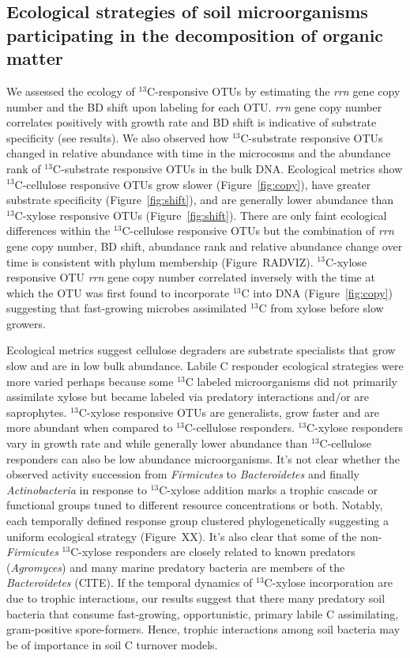 \subsection{Ecological strategies of soil microorganisms participating in the
decomposition of organic matter}
We assessed the ecology of $^{13}$C-responsive OTUs by estimating the
\textit{rrn} gene copy number and the BD shift upon labeling for each OTU.
\textit{rrn} gene copy number correlates positively with growth rate
\citep{11125085} and BD shift is indicative of substrate specificity (see
results). We also observed how $^{13}$C-substrate responsive OTUs changed in
relative abundance with time in the microcosms and the abundance rank of
$^{13}$C-substrate responsive OTUs in the bulk DNA. Ecological metrics show
$^{13}$C-cellulose responsive OTUs grow slower (Figure~\ref{fig:copy}), have
greater substrate specificity (Figure~\ref{fig:shift}), and are generally lower
abundance than $^{13}$C-xylose responsive OTUs (Figure~\ref{fig:shift}). There
are only faint ecological differences within the $^{13}$C-cellulose responsive
OTUs but the combination of \textit{rrn} gene copy number, BD shift, abundance
rank and relative abundance change over time is consistent with phylum
membership (Figure~RADVIZ). $^{13}$C-xylose responsive OTU \textit{rrn} gene
copy number correlated inversely with the time at which the OTU was first
found to incorporate $^{13}$C into DNA (Figure~\ref{fig:copy}) suggesting that
fast-growing microbes assimilated $^{13}$C from xylose before slow growers.  

Ecological metrics suggest cellulose degraders are substrate specialists that
grow slow and are in low bulk abundance. Labile C responder ecological
strategies were more varied perhaps because some $^{13}$C labeled
microorganisms did not primarily assimilate xylose but became labeled via
predatory interactions and/or are saprophytes. $^{13}$C-xylose responsive OTUs
are generalists, grow faster and are more abundant when compared to
$^{13}$C-cellulose responders. $^{13}$C-xylose responders vary in growth rate
and while generally lower abundance than $^{13}$C-cellulose responders can also
be low abundance microorganisms. It's not clear whether the observed activity
succession from \textit{Firmicutes} to \textit{Bacteroidetes} and finally
\textit{Actinobacteria} in response to $^{13}$C-xylose addition marks a trophic
cascade or functional groups tuned to different resource concentrations or
both. Notably, each temporally defined response group clustered
phylogenetically suggesting a uniform ecological strategy (Figure~XX). It's
also clear that some of the non-\textit{Firmicutes} $^{13}$C-xylose responders
are closely related to known predators (\textit{Agromyces}) and many marine
predatory bacteria are members of the \textit{Bacteroidetes} (CITE). If the
temporal dynamics of $^{13}$C-xylose incorporation are due to trophic
interactions, our results suggest that there many predatory soil bacteria that
consume fast-growing, opportunistic, primary labile C assimilating,
gram-positive spore-formers. Hence, trophic interactions among soil bacteria
may be of importance in soil C turnover models.




